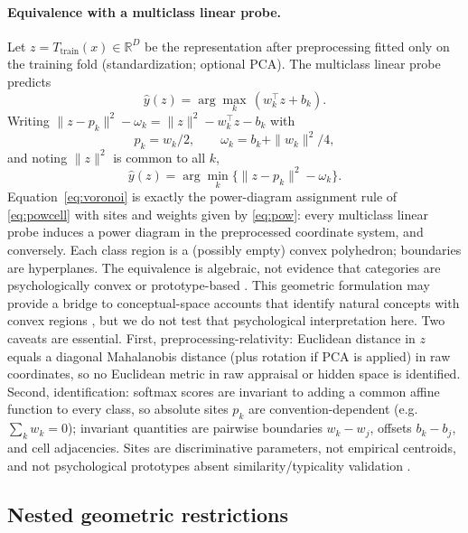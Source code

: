 \documentclass[11pt]{article}
\begin{document}
\paragraph{Equivalence with a multiclass linear probe.}
Let $z = T_{\mathrm{train}}(x)\in\mathbb{R}^{D}$ be the representation after preprocessing fitted only on the training fold (standardization; optional PCA). The multiclass linear probe predicts
\begin{equation}
\hat y(z)=\arg\max_{k}\,(w_{k}^{\top}z+b_{k}). \label{eq:linear}
\end{equation}
Writing $\|z-p_{k}\|^{2}-\omega_{k}=\|z\|^{2}-w_{k}^{\top}z-b_{k}$ with
\begin{equation}
p_{k}=w_{k}/2,\qquad \omega_{k}=b_{k}+\|w_{k}\|^{2}/4, \label{eq:pow}
\end{equation}
and noting $\|z\|^{2}$ is common to all $k$,
\begin{equation}
\hat y(z)=\arg\min_{k}\{\|z-p_{k}\|^{2}-\omega_{k}\}. \label{eq:voronoi}
\end{equation}
Equation~\eqref{eq:voronoi} is exactly the power-diagram assignment rule of \eqref{eq:powcell} with sites and weights given by \eqref{eq:pow}: every multiclass linear probe induces a power diagram in the preprocessed coordinate system, and conversely. Each class region is a (possibly empty) convex polyhedron; boundaries are hyperplanes. The equivalence is algebraic, not evidence that categories are psychologically convex or prototype-based \citep{gardenfors2000conceptual}. This geometric formulation may provide a bridge to conceptual-space accounts that identify natural concepts with convex regions \citep{gardenfors2000conceptual,douven-gardenfors-2020}, but we do not test that psychological interpretation here.
Two caveats are essential. First, preprocessing-relativity: Euclidean distance in $z$ equals a diagonal Mahalanobis distance (plus rotation if PCA is applied) in raw coordinates, so no Euclidean metric in raw appraisal or hidden space is identified. Second, identification: softmax scores are invariant to adding a common affine function to every class, so absolute sites $p_{k}$ are convention-dependent (e.g.\ $\sum_{k}w_{k}=0$); invariant quantities are pairwise boundaries $w_{k}-w_{j}$, offsets $b_{k}-b_{j}$, and cell adjacencies. Sites are discriminative parameters, not empirical centroids, and not psychological prototypes absent similarity/typicality validation \citep{nosofsky1986attention,shepard1987toward}.
\subsection{Nested geometric restrictions}
\label{sec:ladder-defs}
\end{document}
